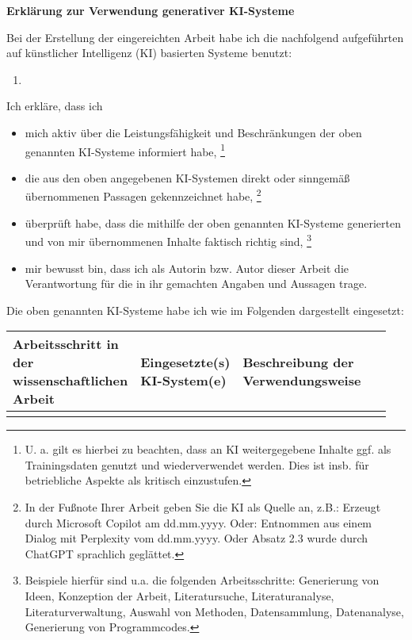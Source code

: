 \clearpage

\thispagestyle{empty}

{\LARGE\textsf{\textbf{Erklärung zur Verwendung generativer KI-Systeme}}\bigskip}

Bei der Erstellung der eingereichten Arbeit habe ich die nachfolgend aufgeführten auf künstlicher Intelligenz (KI) basierten Systeme benutzt:
\begin{enumerate}
  \item
\end{enumerate}

Ich erkläre, dass ich
\begin{itemize}
  \item mich aktiv über die Leistungsfähigkeit und Beschränkungen der oben genannten KI-Systeme informiert habe, \footnote{U. a. gilt es hierbei zu beachten, dass an KI weitergegebene Inhalte ggf. als Trainingsdaten genutzt und wiederverwendet werden. Dies ist insb. für betriebliche Aspekte als kritisch einzustufen.}
  \item die aus den oben angegebenen KI-Systemen direkt oder sinngemäß übernommenen Passagen gekennzeichnet habe, \footnote{In der Fußnote Ihrer Arbeit geben Sie die KI als Quelle an, z.B.: Erzeugt durch Microsoft Copilot am dd.mm.yyyy. Oder: Entnommen aus einem Dialog mit Perplexity vom dd.mm.yyyy. Oder Absatz 2.3 wurde durch ChatGPT sprachlich geglättet.}
  \item überprüft habe, dass die mithilfe der oben genannten KI-Systeme generierten und von mir übernommenen Inhalte faktisch richtig sind, \footnote{Beispiele hierfür sind u.a. die folgenden Arbeitsschritte: Generierung von Ideen, Konzeption der Arbeit, Literatursuche, Literaturanalyse, Literaturverwaltung, Auswahl von Methoden, Datensammlung, Datenanalyse, Generierung von Programmcodes.}
  \item mir bewusst bin, dass ich als Autorin bzw. Autor dieser Arbeit die Verantwortung für die in ihr gemachten Angaben und Aussagen trage.
\end{itemize}

\vspace{1cm}

Die oben genannten KI-Systeme habe ich wie im Folgenden dargestellt eingesetzt:
\begin{center}
  \begin{tabular}{| p{0.25\linewidth} | p{0.2\linewidth} | p{0.5\linewidth} |}
    \hline
    \textbf{Arbeitsschritt in der wissenschaftlichen Arbeit} & \textbf{Eingesetzte(s) KI-System(e)} & \textbf{Beschreibung der Verwendungsweise} \\
    \hline
                                                             &                                      &                                            \\
    \hline
  \end{tabular}
\end{center}
